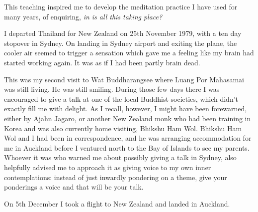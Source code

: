 This teaching inspired me to develop the meditation practice I have used
for many years, of enquiring, \emph{in  is all this taking place?}

I departed Thailand for New Zealand on 25th November 1979, with a ten
day stopover in Sydney. On landing in Sydney airport and exiting the
plane, the cooler air seemed to trigger a sensation which gave me a
feeling like my brain had started working again. It was as if I had been
partly brain dead.

This was my second visit to Wat Buddharangsee where Luang Por
Mahasamai was still living. He was still smiling. During those few days
there I was encouraged to give a talk at one of the local Buddhist
societies, which didn't exactly fill me with delight. As I recall,
however, I might have been forewarned, either by Ajahn Jagaro, or
another New Zealand monk who had been training in Korea and was also
currently home visiting, Bhikshu Ham Wol. Bhikshu Ham Wol and I had been
in correspondence, and he was arranging accommodation for me in Auckland
before I ventured north to the Bay of Islands to see my parents. Whoever
it was who warned me about possibly giving a talk in Sydney, also
helpfully advised me to approach it as giving voice to my own inner
contemplations: instead of just inwardly pondering on a theme, give your
ponderings a voice and that will be your talk.

On 5th December I took a flight to New Zealand and landed in Auckland.

